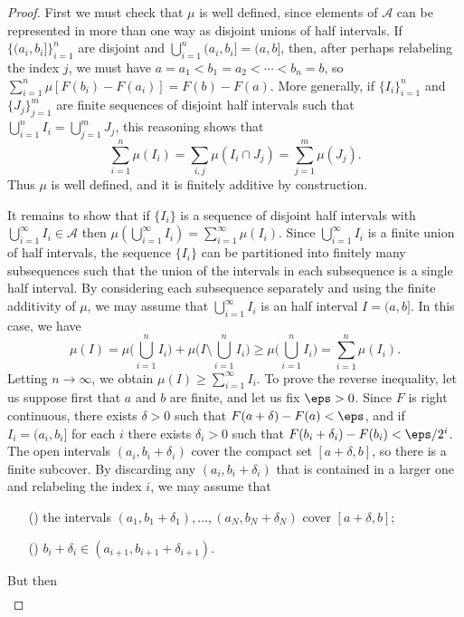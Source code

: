 \begin{proof}
First we must check that $\mu$ is well defined, since elements of $\mathcal{A}$ can be represented in more than one way as disjoint unions of half intervals. If $\{(a_i,b_i]\}_{i=1}^{n}$ are disjoint and $\bigcup_{i=1}^{n}(a_i,b_i]=(a,b]$, then, after perhaps relabeling the index $j$, we
must have $a=a_1<b_1=a_2<\cdots<b_n=b$, so $\sum_{i=1}^{n}\mu[F(b_i)-F(a_i)]=F(b)-F(a)$. More generally, if $\{I_i\}_{i=1}^{n}$ and $\{J_j\}_{j=1}^{m}$ are finite sequences of disjoint half intervals such that $\bigcup_{i=1}^{n}I_i=\bigcup_{j=1}^{m}J_j$, this reasoning shows that
\[\sum_{i=1}^{n}\mu(I_i)=\sum_{i,j}\mu(I_i\cap J_j)=\sum_{j=1}^{m}\mu(J_j).\]
Thus $\mu$ is well defined, and it is finitely additive by construction.\par
It remains to show that if $\{I_i\}$ is a sequence of disjoint half intervals with $\bigcup_{i=1}^{\infty}I_i\in\mathcal{A}$ then $\mu(\bigcup_{i=1}^{\infty}I_i)=\sum_{i=1}^{\infty}\mu(I_i)$. Since $\bigcup_{i=1}^{\infty}I_i$ is a finite union of half intervals, the sequence $\{I_i\}$ can be partitioned into finitely many subsequences such that the union of the intervals in each subsequence is a single half interval. By considering each subsequence separately and using the finite additivity of $\mu$, we may assume that $\bigcup_{i=1}^{\infty}I_i$ is an half interval $I=(a,b]$. In this case, we have
\[\mu(I)=\mu\Big(\bigcup_{i=1}^{n}I_i\Big)+\mu\Big(I\setminus\bigcup_{i=1}^{n}I_i\Big)\geq\mu\Big(\bigcup_{i=1}^{n}I_i\Big)=\sum_{i=1}^{n}\mu(I_i).\]
Letting $n\to\infty$, we obtain $\mu(I)\geq\sum_{i=1}^{\infty}I_i$. To prove the reverse inequality, let us suppose first that $a$ and $b$ are finite, and let us fix $\eps>0$. Since $F$ is right continuous, there exists $\delta>0$ such that $F(a+\delta)-F(a)<\eps$, and if $I_i=(a_i,b_i]$ for each $i$ there exists $\delta_i>0$ such that $F(b_i+\delta_i)-F(b_i)<\eps/2^i$. The open intervals $(a_i,b_i+\delta_i)$ cover the compact set $[a+\delta,b]$, so there is a finite subcover. By discarding any $(a_i,b_i+ \delta_i)$ that is contained in a larger one and relabeling the index $i$, we may assume that
\begin{itemize}
\item[(\rmnum{1})] the intervals $(a_1,b_1+\delta_1),\dots,(a_N,b_N+\delta_N)$ cover $[a+\delta,b]$;
\item[(\rmnum{2})] $b_i+\delta_i\in(a_{i+1},b_{i+1}+\delta_{i+1})$.
\end{itemize}
But then
\begin{align*}

\end{align*}
\end{proof}
